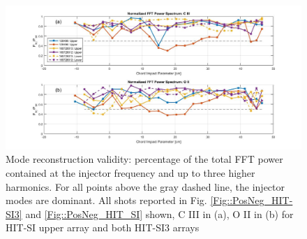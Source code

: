 	\begin{center}
		\begin{figure}
			\hspace*{-10ex}\includegraphics[width=8in]{FFT_3}\caption{Mode reconstruction validity: percentage of the total FFT power contained at the injector frequency and up to three higher harmonics. For all points above the gray dashed line, the injector modes are dominant. All shots reported in Fig. \ref{Fig::PosNeg_HIT-SI3} and \ref{Fig::PosNeg_HIT_SI} shown, C III in (a), O II in (b) for HIT-SI upper array and both HIT-SI3 arrays}\label{Fig::FFT Spect}
		\end{figure}
	\end{center}
	
	
